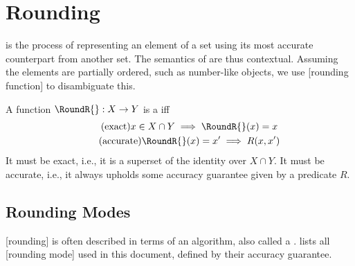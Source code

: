 \section{Rounding}

 is the process of representing an element of a set using its most accurate counterpart from another set.
The semantics of  are thus contextual.
Assuming the elements are partially ordered, such as number-like objects, we use [rounding function] to disambiguate this.

\begin{definition}
    A function \(\RoundR{} : X \to Y\) is a  iff
    \begin{gather*}
        \label{eq:exact}
        \tag{exact}
        x \in X \cap Y \implies \RoundR{}(x) = x \\
        \label{eq:accurate}
        \tag{accurate}
        \RoundR{}(x) = x^\prime \implies R(x,x^\prime)
    \end{gather*}
    It must be exact, i.e., it is a superset of the identity over \(X \cap Y\).
    It must be accurate, i.e., it always upholds some accuracy guarantee given by a predicate \(R\).
\end{definition}

\subsection{Rounding Modes}

[rounding] is often described in terms of an algorithm, also called a .
 lists all [rounding mode] used in this document, defined by their accuracy guarantee.

